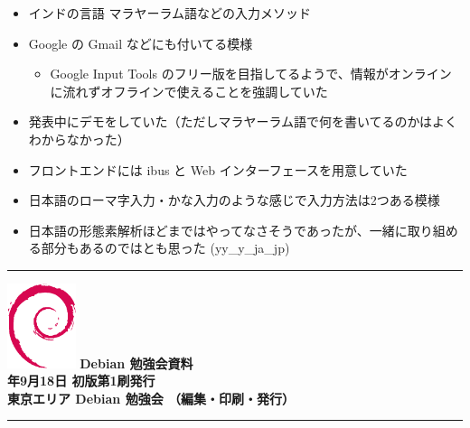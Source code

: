 \documentclass[mingoth,a4paper]{jsarticle}
\newcommand{\debmtgyear}{2021}
\newcommand{\debmtgmonth}{9}
\newcommand{\debmtgdate}{18}
\begin{document}
\begin{itemize}
\item インドの言語 マラヤーラム語などの入力メソッド
\item Google の Gmail などにも付いてる模様
  \begin{itemize}
  \item Google Input Tools のフリー版を目指してるようで、情報がオンラインに流れずオフラインで使えることを強調していた
  \end{itemize}
\item 発表中にデモをしていた（ただしマラヤーラム語で何を書いてるのかはよくわからなかった）
\item フロントエンドには ibus と Web インターフェースを用意していた
\item 日本語のローマ字入力・かな入力のような感じで入力方法は2つある模様
\item 日本語の形態素解析ほどまではやってなさそうであったが、一緒に取り組める部分もあるのではとも思った (yy\_y\_ja\_jp)
\end{itemize}



\vspace*{15cm}
\hrule
\vspace{2mm}
\includegraphics[width=2cm]{image-assets/openlogo-nd.eps}
\noindent \Large \bf Debian 勉強会資料\\
\noindent \normalfont \debmtgyear{}年\debmtgmonth{}月\debmtgdate{}日 \hspace{5mm}  初版第1刷発行\\
\noindent \normalfont 東京エリア Debian 勉強会 （編集・印刷・発行）\\
\hrule
\end{document}

